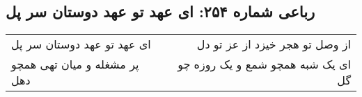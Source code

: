 \begin{center}
\section*{رباعی شماره ۲۵۴: ای عهد تو عهد دوستان سر پل}
\label{sec:sh254}
\begin{longtable}{l p{0.5cm} r}
ای عهد تو عهد دوستان سر پل
&&
از وصل تو هجر خیزد از عز تو دل
\\
پر مشغله و میان تهی همچو دهل
&&
ای یک شبه همچو شمع و یک روزه چو گل
\\
\end{longtable}
\end{center}

